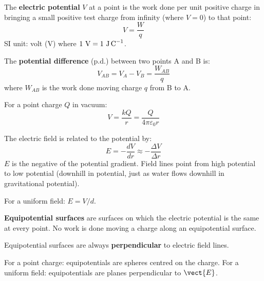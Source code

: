 \begin{definitionbox}
The \textbf{electric potential} $V$ at a point is the
work done per unit positive charge in bringing a small
positive test charge from infinity (where $V = 0$) to
that point:
\[
  V = \frac{W}{q}
\]
SI unit: volt (V) where $1\ \text{V}
= 1\ \text{J\,C}^{-1}$.

The \textbf{potential difference} (p.d.) between two
points A and B is:
\[
  V_{AB} = V_A - V_B
  = \frac{W_{AB}}{q}
\]
where $W_{AB}$ is the work done moving charge $q$
from B to A.

For a point charge $Q$ in vacuum:
\[
  V = \frac{kQ}{r} = \frac{Q}{4\pi\varepsilon_0 r}
\]
\end{definitionbox}

\begin{keybox}
The electric field is related to the potential by:
\[
  E = -\frac{dV}{dr}
  \approx -\frac{\Delta V}{\Delta r}
\]
$E$ is the negative of the potential gradient.
Field lines point from high potential to low potential
(downhill in potential, just as water flows downhill
in gravitational potential).

For a uniform field: $E = V/d$.
\end{keybox}

\begin{definitionbox}
\textbf{Equipotential surfaces} are surfaces on
which the electric potential is the same at every
point. No work is done moving a charge along an
equipotential surface.

Equipotential surfaces are always \textbf{perpendicular}
to electric field lines.

For a point charge: equipotentials are spheres
centred on the charge.
For a uniform field: equipotentials are planes
perpendicular to $\vect{E}$.
\end{definitionbox}

